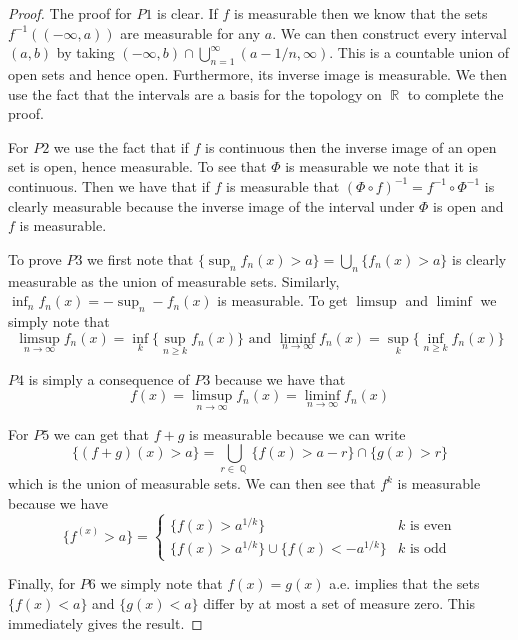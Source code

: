 \documentclass{article}
\DeclareMathOperator{\Q}{\mathbb{Q}}
\DeclareMathOperator{\R}{\mathbb{R}}
\begin{document}
\begin{proof}
  The proof for $P1$ is clear. If $f$ is measurable then we know that the
  sets $f^{-1}((-\infty, a))$ are measurable for any $a$. We can then
  construct every interval $(a,b)$ by taking $(-\infty, b) \cap
  \bigcup_{n=1}^\infty (a-1/n, \infty)$. This is a countable union of open
  sets and hence open. Furthermore, its inverse image is measurable. We then
  use the fact that the intervals are a basis for the topology on $\R$ to
  complete the proof.

  For $P2$ we use the fact that if $f$ is continuous then the inverse image
  of an open set is open, hence measurable. To see that $\Phi$ is measurable
  we note that it is continuous. Then we have that if $f$ is measurable that
  $(\Phi \circ f)^{-1} = f^{-1} \circ \Phi^{-1}$ is clearly measurable because
  the inverse image of the interval under $\Phi$ is open and $f$ is
  measurable.

  To prove $P3$ we first note that $\{\sup_n f_n(x) > a\} = \bigcup_n
  \{f_n(x) > a\}$ is clearly measurable as the union of measurable sets.
  Similarly, $\inf_n f_n(x) = -\sup_n -f_n(x)$ is measurable. To get
  $\limsup$ and $\liminf$ we simply note that
  \[
  \limsup_{n\to \infty} f_n(x) = \inf_k\{\sup_{n \geq k} f_n(x)\} \text{ and }
  \liminf_{n\to \infty} f_n(x) = \sup_k\{\inf_{n \geq k} f_n(x)\}
  \]

  $P4$ is simply a consequence of $P3$ because we have that
  \[
  f(x) = \limsup_{n\to\infty} f_n(x) = \liminf_{n\to\infty} f_n(x)
  \]

  For $P 5$ we can get that $f+g$ is measurable because we can write
  \[
  \{(f+g)(x) > a\} = \bigcup_{r \in \Q} \{f(x) > a - r\} \cap \{g(x) > r\}
  \]
  which is the union of measurable sets. We can then see that $f^k$ is
  measurable because we have
  \[
  \{f^(x) > a\} =
  \begin{cases}
    \{f(x) > a^{1/k}\} & k \text{ is even} \\
    \{f(x) > a^{1/k}\} \cup \{f(x) < -a^{1/k}\} & k \text{ is odd}
  \end{cases}
  \]

  Finally, for $P6$ we simply note that $f(x) = g(x)$ a.e. implies that the
  sets $\{f(x) < a\}$ and $\{g(x) < a\}$ differ by at most a set of measure
  zero. This immediately gives the result.
\end{proof}
\end{document}
